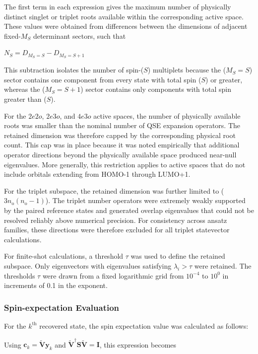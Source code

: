 \MaxDimensionsEquation

The first term in each expression gives the maximum number of physically distinct singlet or triplet roots available within the corresponding active space. These values were obtained from differences between the dimensions of adjacent fixed-$M_S$ determinant sectors, such that

$N_S=D_{M_S=S}-D_{M_S=S+1}$

This subtraction isolates the number of spin-($S$) multiplets because the ($M_S=S$) sector contains one component from every state with total spin ($S$) or greater, whereas the ($M_S=S+1$) sector contains only components with total spin greater than ($S$).

For the $2e2o$, $2e3o$, and $4e3o$ active spaces, the number of physically available roots was smaller than the nominal number of QSE expansion operators. The retained dimension was therefore capped by the corresponding physical root count. This cap was in place because it was noted empirically that additional operator directions beyond the physically available space produced near-null eigenvalues. More generally, this restriction applies to active spaces that do not include orbitals extending from HOMO-1 through LUMO+1. 

For the triplet subspace, the retained dimension was further limited to ($3n_\mathrm{o}(n_\mathrm{o}-1)$). The triplet number operators were extremely weakly supported by the paired reference states and generated overlap eigenvalues that could not be resolved reliably above numerical precision. For consistency across ansatz families, these directions were therefore excluded for all triplet statevector calculations. 

For finite-shot calculations, a threshold $\tau$ was used to define the retained subspace. Only eigenvectors with eigenvalues satisfying $\lambda_i > \tau$ were retained. The thresholds $\tau$ were drawn from a fixed logarithmic grid from $10^{-4}$ to $10^{0}$ in increments of 0.1 in the exponent. 

\subsubsection{Spin-expectation Evaluation}

For the $k^\mathrm{th}$ recovered state, the spin expectation value was calculated as follows:

\SpinExpectationQSEBasisEquation

Using $\mathbf{c}_k=\tilde{\mathbf{V}}\mathbf{y}_k$ and
$\tilde{\mathbf{V}}^{\dagger}\mathbf{S}\tilde{\mathbf{V}}=\mathbf{I}$, this
expression becomes

\SpinExpectationShortenedBasisEquation
